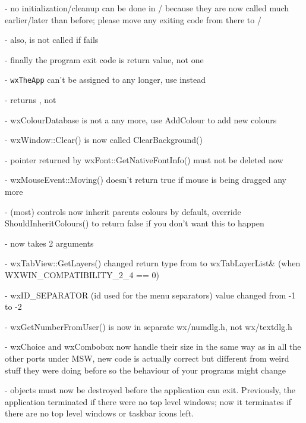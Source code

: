 
- no initialization/cleanup can be done in / because they are
  now called much earlier/later than before; please move any exiting code
  from there to /

- also,  is not called if  fails

- finally the program exit code is  return value, not  one

- \texttt{wxTheApp} can't be assigned to any longer, use  instead

-  returns , not 

- wxColourDatabase is not a  any more, use AddColour to add new colours

- wxWindow::Clear() is now called ClearBackground()

- pointer returned by wxFont::GetNativeFontInfo() must not be deleted now

- wxMouseEvent::Moving() doesn't return true if mouse is being dragged any more

- (most) controls now inherit parents colours by default, override
  ShouldInheritColours() to return false if you don't want this to happen

-  now takes 2 arguments

- wxTabView::GetLayers() changed return type from  to wxTabLayerList&
  (when WXWIN\_COMPATIBILITY\_2\_4 == 0)

- wxID\_SEPARATOR (id used for the menu separators) value changed from -1 to -2

- wxGetNumberFromUser() is now in separate wx/numdlg.h, not wx/textdlg.h

- wxChoice and wxCombobox now handle their size in the same way as in all the
  other ports under MSW, new code is actually correct but different from weird
  stuff they were doing before so the behaviour of your programs might change

-  objects must now be destroyed before the application can exit.
  Previously, the application terminated if there were no top level windows;
  now it terminates if there are no top level windows or taskbar icons left.

